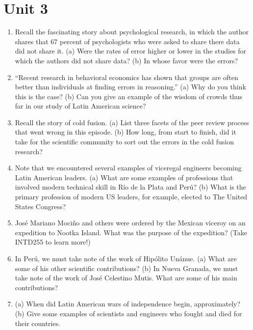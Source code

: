 \documentclass[10pt]{article}
\begin{document}
\maketitle

\section{Unit 3}

\begin{enumerate}
\item Recall the fascinating story about psychological research, in which the author shares that 67 percent of psychologists who were asked to share there data did not share it. (a) Were the rates of error higher or lower in the studies for which the authors did not share data? (b) In whose favor were the errors? \\ \vspace{0.5cm}
\item ``Recent research in behavioral economics has shown that groups are often better than individuals at finding errors in reasoning.'' (a) Why do you think this is the case? (b) Can you give an example of the wisdom of crowds thus far in our study of Latin American science? \\ \vspace{2cm}
\item Recall the story of cold fusion. (a) List three facets of the peer review process that went wrong in this episode. (b) How long, from start to finish, did it take for the scientific community to sort out the errors in the cold fusion research? \\ \vspace{2cm}
\item Note that we encountered several examples of viceregal engineers becoming Latin American leaders. (a) What are some examples of professions that involved modern technical skill in R\'{i}o de la Plata and Per\'{u}? (b) What is the primary profession of modern US leaders, for example, elected to The United States Congress? \\ \vspace{1.5cm}
\item Jos\'{e} Mariano Moci\~{n}o and others were ordered by the Mexican viceroy on an expedition to Nootka Island. What was the purpose of the expedition? (Take INTD255 to learn more!) \\ \vspace{1cm}
\item In Per\'{u}, we must take note of the work of Hip\'{o}lito Un\'{a}nue.  (a) What are some of his other scientific contributions? (b) In Nueva Granada, we must take note of the work of Jos\'{e} Celestino Mutis. What are some of his main contributions? \\ \vspace{1.5cm}
\item (a) When did Latin American wars of independence begin, approximately? (b) Give some examples of scientists and engineers who fought and died for their countries. \\ \vspace{1cm}
\end{enumerate}
\end{document}
